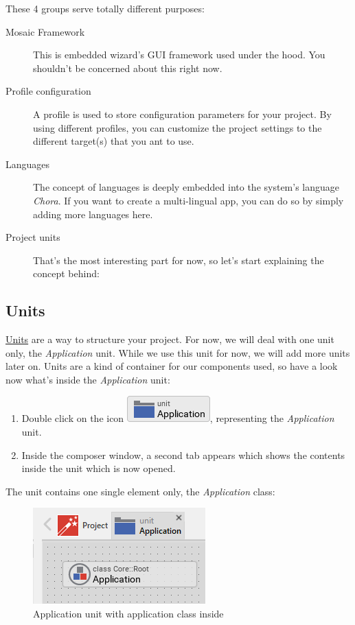 \documentclass[
  a4paper,
,tablecaptionabove
]{scrbook}
\begin{document}
These 4 groups serve totally different purposes:

\begin{description}
\item[Mosaic Framework]
This is embedded wizard's GUI framework used under the hood. You
shouldn't be concerned about this right now.
\item[Profile configuration]
A profile is used to store configuration parameters for your project. By
using different profiles, you can customize the project settings to the
different target(s) that you ant to use.
\item[Languages]
The concept of languages is deeply embedded into the system's language
\emph{Chora}. If you want to create a multi-lingual app, you can do so
by simply adding more languages here.
\item[Project units]
That's the most interesting part for now, so let's start explaining the
concept behind:
\end{description}

\hypertarget{_units}{%
\subsection{Units}\label{_units}}

\href{https://doc.embedded-wizard.de/unit-member}{Units} are a way to
structure your project. For now, we will deal with one unit only, the
\emph{Application} unit. While we use this unit for now, we will add
more units later on. Units are a kind of container for our components
used, so have a look now what's inside the \emph{Application} unit:

\begin{enumerate}
\def\labelenumi{\arabic{enumi}.}
\item
  Double click on the icon
  \includegraphics{./../asciidoc/modules/ROOT/assets/images/icons/ApplicationUnitIcon.png},
  representing the \emph{Application} unit.
\item
  Inside the composer window, a second tab appears which shows the
  contents inside the unit which is now opened.
\end{enumerate}

The unit contains one single element only, the \emph{Application} class:

\begin{figure}
\centering
\includegraphics{./../asciidoc/modules/ROOT/assets/images/helloworld/ApplicationUnit.png}
\caption{Application unit with application class inside}
\end{figure}
\end{document}
